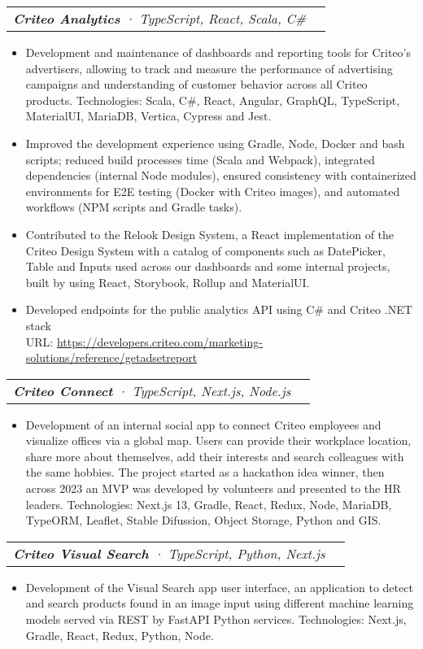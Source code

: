 \documentclass[letterpaper,11pt]{article}
\makeatletter
\newcommand{\resumeItem}[1]{
  \item\small{
    {#1 \vspace{-2pt}}
  }
}
\newcommand{\resumeSubSubheading}[2]{
    \vspace{-2pt}\item
    \begin{tabular*}{0.97\textwidth}{l@{\extracolsep{\fill}}r}
      \textit{\small#1} & \textit{\small #2} \\
    \end{tabular*}\vspace{-7pt}
}
\newcommand{\resumeItemListStart}{\begin{itemize}}
\newcommand{\resumeItemListEnd}{\end{itemize}\vspace{-5pt}}
\makeatother
\begin{document}
    \resumeSubSubheading{\textbf{Criteo Analytics} · TypeScript, React, Scala, C\# }{}
        \resumeItemListStart
          \resumeItem{Development and maintenance of dashboards and reporting tools for Criteo's advertisers, allowing to track and measure the performance of advertising campaigns and understanding of customer behavior across all Criteo products. Technologies: Scala, C\#, React, Angular, GraphQL, TypeScript, MaterialUI, MariaDB, Vertica, Cypress and Jest.}
          \resumeItem{Improved the development experience using Gradle, Node, Docker and bash scripts; reduced build processes time (Scala and Webpack), integrated dependencies (internal Node modules), ensured consistency with containerized environments for E2E testing (Docker with Criteo images), and automated workflows (NPM scripts and Gradle tasks).}
          \resumeItem{Contributed to the Relook Design System, a React implementation of the Criteo Design System with a catalog of components such as DatePicker, Table and Inputs used across our dashboards and some internal projects, built by using React, Storybook, Rollup and MaterialUI.}
          \resumeItem{Developed endpoints for the public analytics API using C\# and Criteo .NET stack
          \\[1.5pt] URL: {\href{https://developers.criteo.com/marketing-solutions/reference/getadsetreport}{\color{blue}https://developers.criteo.com/marketing-solutions/reference/getadsetreport}}
          }
          \resumeItemListEnd
    
        \resumeSubSubheading{\textbf{Criteo Connect} · TypeScript, Next.js, Node.js }{}
        \resumeItemListStart
          \resumeItem{Development of an internal social app to connect Criteo employees and visualize offices via a global map. Users can provide their workplace location, share more about themselves, add their interests and search colleagues with the same hobbies. The project started as a hackathon idea winner, then across 2023 an MVP was developed by volunteers and presented to the HR leaders. Technologies: Next.js 13, Gradle, React, Redux, Node, MariaDB, TypeORM, Leaflet, Stable Difussion, Object Storage, Python and GIS.}
          \resumeItemListEnd
      
      \resumeSubSubheading{\textbf{Criteo Visual Search} · TypeScript, Python, Next.js }{}
        \resumeItemListStart
          \resumeItem{Development of the Visual Search app user interface, an application to detect and search products found in an image input using different machine learning models served via REST by FastAPI Python services.
          Technologies: Next.js, Gradle, React, Redux, Python, Node.}
          \resumeItemListEnd
\end{document}
